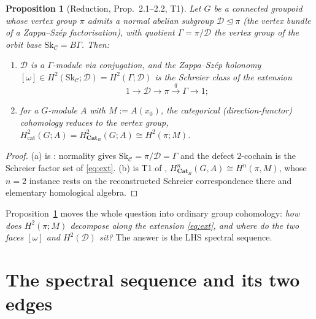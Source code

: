\documentclass[11pt]{article}
\newtheorem{proposition}[theorem]{Proposition}
\theoremstyle{definition}
\newcommand{\Sk}{\mathrm{Sk}}
\newcommand{\C}{\mathcal{C}}
\newcommand{\D}{\mathcal{D}}
\newcommand{\CatB}{\mathbf{Cat}_B}
\begin{document}
\begin{proposition}[Reduction, \cite{gzs} Prop.~2.1--2.2, \cite{sep2} T1]
\label{prop:reduce}
Let $G$ be a connected groupoid whose vertex group $\pi$ admits a normal abelian
subgroup $\D\trianglelefteq\pi$ (the vertex bundle of a Zappa--Sz\'ep
factorisation), with quotient $\Gamma=\pi/\D$ the vertex group of the orbit base
$\Sk_\C=B\Gamma$. Then:
\begin{enumerate}
\item[\textup{(a)}] $\D$ is a $\Gamma$-module via conjugation, and the
Zappa--Sz\'ep holonomy $[\omega]\in H^2(\Sk_\C;\D)=H^2(\Gamma;\D)$ is the
Schreier class of the extension
\begin{equation}\label{eq:ext}
   1\longrightarrow\D\longrightarrow\pi\xrightarrow{\ q\ }\Gamma\longrightarrow1;
\end{equation}
\item[\textup{(b)}] for a $G$-module $A$ with $M:=A(x_0)$, the categorical
(direction-functor) cohomology reduces to the vertex group,
$H^2_{\mathrm{cat}}(G;A)=H^2_{\CatB}(G;A)\cong H^2(\pi;M)$.
\end{enumerate}
\end{proposition}
\begin{proof}
(a) is \cite[Prop.~2.1--2.2]{gzs}: normality gives $\Sk_\C=\pi/\D=\Gamma$ and the
defect $2$-cochain is the Schreier factor set of \eqref{eq:ext}. (b) is T1 of
\cite{sep2}, $H^n_{\CatB}(G,A)\cong H^n(\pi,M)$, whose $n=2$ instance rests on
the reconstructed Schreier correspondence there and elementary homological
algebra.
\end{proof}

Proposition~\ref{prop:reduce} moves the whole question into ordinary group
cohomology: \emph{how does $H^2(\pi;M)$ decompose along the extension
\eqref{eq:ext}, and where do the two faces $[\omega]$ and $H^2(\D)$ sit?} The
answer is the LHS spectral sequence.

\section{The spectral sequence and its two edges}
\end{document}
